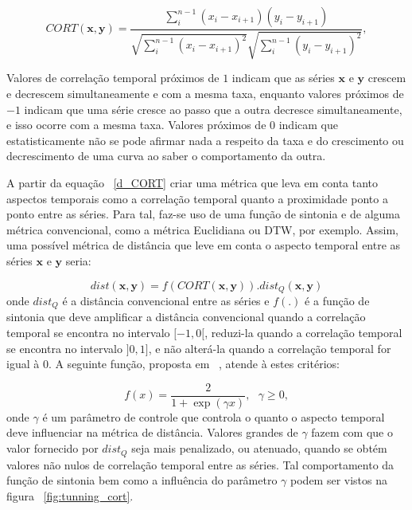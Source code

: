 \begin{equation} \label{d_CORT}
CORT (\bm{x},\bm{y}) = \frac{\sum_{i}^{n-1}(x_i-x_{i+1}) (y_i-y_{i+1})}{\sqrt{\sum_{i}^{n-1}(x_i-x_{i+1})^2}\sqrt{\sum_{i}^{n-1}(y_i-y_{i+1})^2}},
\end{equation}

Valores de correlação temporal próximos de $1$ indicam que as séries $\bm{x}$ e $\bm{y}$ crescem e decrescem simultaneamente e com a mesma taxa, enquanto valores próximos de $-1$ indicam que uma série cresce ao passo que a outra decresce simultaneamente, e isso ocorre com a mesma taxa. Valores próximos de $0$ indicam que estatisticamente não se pode afirmar nada a respeito da taxa e do crescimento ou decrescimento de uma curva ao saber o comportamento da outra.

A partir da equação ~\ref{d_CORT} criar uma métrica que leva em conta tanto aspectos temporais como a correlação temporal quanto a proximidade ponto a ponto entre as séries. Para tal, faz-se uso de uma função de sintonia e de alguma métrica convencional, como a métrica Euclidiana ou DTW, por exemplo. Assim, uma possível métrica de distância que leve em conta o aspecto temporal  entre as séries $\bm{x}$ e $\bm{y}$ seria:

\begin{equation}
dist(\bm{x},\bm{y}) = f(CORT (\bm{x},\bm{y})).dist_Q(\bm{x},\bm{y}) 
\end{equation}
onde $dist_Q$ é a distância convencional entre as séries e $f(.)$ é a função de sintonia que deve amplificar a distância convencional quando a correlação temporal se encontra no intervalo $[-1,0[$, reduzi-la quando a correlação temporal se encontra no intervalo $]0,1]$, e não alterá-la quando a correlação temporal for igual à $0$. A seguinte função, proposta em  ~\parencite{cort}, atende à estes critérios:

\begin{equation} \label{eq:tunning_func}
f(x) = \frac{2}{1+\exp(\gamma x)},\text{ 				} \gamma \geq 0,
\end{equation}
onde $\gamma$ é um parâmetro de controle que controla o quanto o aspecto temporal deve influenciar na métrica de distância. Valores grandes de $\gamma$ fazem com que o valor fornecido por $dist_Q$ seja mais penalizado, ou atenuado, quando se obtém valores não nulos de correlação temporal entre as séries. Tal comportamento da função de sintonia bem como a influência do parâmetro $\gamma$ podem ser vistos na figura ~\ref{fig:tunning_cort}.


